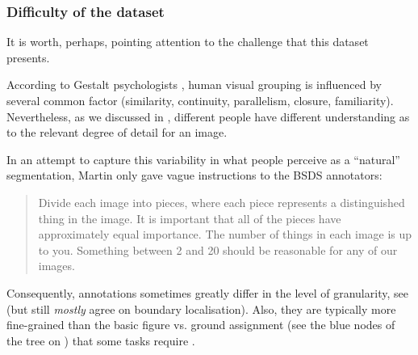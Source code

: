 \subsubsection{Difficulty of the dataset}
It is worth, perhaps, pointing attention to the challenge that this dataset presents.

According to Gestalt psychologists \cite{Wertheimer1923untersuchungen,Kohler1929task,Koffka1935principles,Wertheimer1938laws}, human visual grouping is influenced by several common factor (\eg similarity, continuity, parallelism, closure, familiarity). Nevertheless, as we discussed in , different people have different understanding as to the relevant degree of detail for an image. 

In an attempt to capture this variability in what people perceive as a ``natural'' segmentation, Martin \etal \cite{Martin01} only gave vague instructions to the BSDS annotators: \begin{quote}Divide each image into pieces, where each piece represents a distinguished thing in the image. It is important that all of the pieces have approximately equal importance. The number of things in each image is up to you. Something between 2 and 20 should be reasonable for any of our images.\end{quote}

Consequently, annotations sometimes greatly differ in the level of granularity, see  (but still {\it mostly} agree on boundary localisation). Also, they are typically more fine-grained than the basic %
figure vs. ground assignment (see the blue nodes of the tree on ) that some tasks require \cite{Ren2006figure,Sundberg2011occlusion}.

